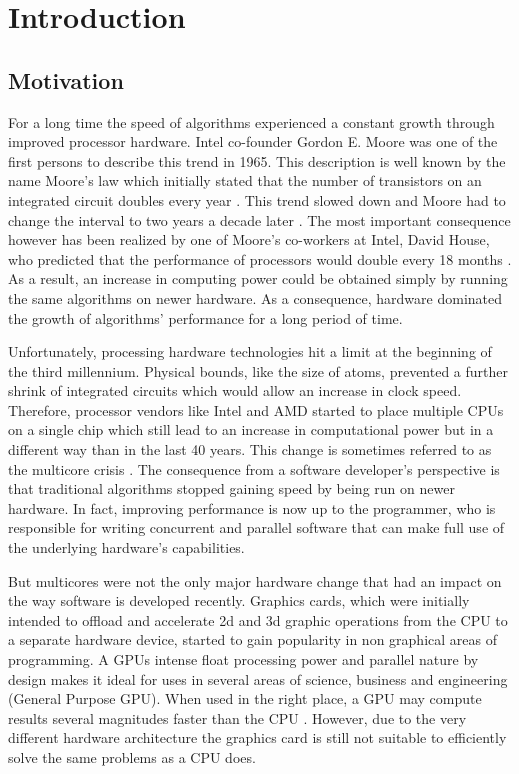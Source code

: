 \section{Introduction}

\subsection{Motivation}

For a long time the speed of algorithms experienced a constant growth through improved processor hardware. Intel co-founder Gordon E. Moore was one of the first persons to describe this trend in 1965. This description is well known by the name Moore's law which initially stated that the number of transistors on an integrated circuit doubles every year \cite{moore_law}. This trend slowed down and Moore had to change the interval to two years a decade later \cite{moore_law_2003}. The most important consequence however has been realized by one of Moore's co-workers at Intel, David House, who predicted that the performance of processors would double every 18 months \cite{moore_law_2003}. As a result, an increase in computing power could be obtained simply by running the same algorithms on newer hardware. As a consequence, hardware dominated the growth of algorithms' performance for a long period of time.

Unfortunately, processing hardware technologies hit a limit at the beginning of the third millennium. Physical bounds, like the size of atoms, prevented a further shrink of integrated circuits which would allow an increase in clock speed. Therefore, processor vendors like Intel and AMD started to place multiple CPUs on a single chip which still lead to an increase in computational power but in a different way than in the last 40 years. This change is sometimes referred to as the multicore crisis \cite{multicore_crisis}. The consequence from a software developer's perspective is that traditional algorithms stopped gaining speed by being run on newer hardware. In fact, improving performance is now up to the programmer, who is responsible for writing concurrent and parallel software that can make full use of the underlying hardware's capabilities. 

But multicores were not the only major hardware change that had an impact on the way software is developed recently. Graphics cards, which were initially intended to offload and accelerate 2d and 3d graphic operations from the CPU to a separate hardware device, started to gain popularity in non graphical areas of programming. A GPUs intense float processing power and parallel nature by design makes it ideal for uses in several areas of science, business and engineering (General Purpose GPU). When used in the right place, a GPU may compute results several magnitudes faster than the CPU \cite{gpu_history}. However, due to the very different hardware architecture the graphics card is still not suitable to efficiently solve the same problems as a CPU does.

